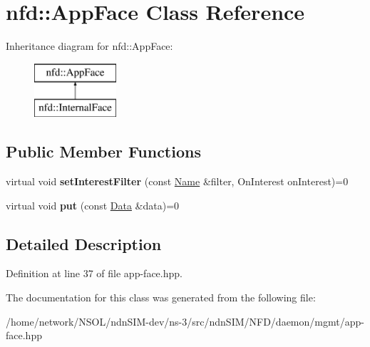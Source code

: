 \hypertarget{classnfd_1_1AppFace}{}\section{nfd\+:\+:App\+Face Class Reference}
\label{classnfd_1_1AppFace}
Inheritance diagram for nfd\+:\+:App\+Face\+:\begin{figure}[H]
\begin{center}
\leavevmode
\includegraphics[height=2.000000cm]{classnfd_1_1AppFace}
\end{center}
\end{figure}
\subsection*{Public Member Functions}
\begin{DoxyCompactItemize}
\item 
virtual void {\bfseries set\+Interest\+Filter} (const \hyperlink{classndn_1_1Name}{Name} \&filter, On\+Interest on\+Interest)=0\hypertarget{classnfd_1_1AppFace_a802bffeab9e689492937f77d9bfaa3c7}{}\label{classnfd_1_1AppFace_a802bffeab9e689492937f77d9bfaa3c7}

\item 
virtual void {\bfseries put} (const \hyperlink{classndn_1_1Data}{Data} \&data)=0\hypertarget{classnfd_1_1AppFace_ab0c196e816296ba8183b616b510b4ab1}{}\label{classnfd_1_1AppFace_ab0c196e816296ba8183b616b510b4ab1}

\end{DoxyCompactItemize}


\subsection{Detailed Description}


Definition at line 37 of file app-\/face.\+hpp.



The documentation for this class was generated from the following file\+:\begin{DoxyCompactItemize}
\item 
/home/network/\+N\+S\+O\+L/ndn\+S\+I\+M-\/dev/ns-\/3/src/ndn\+S\+I\+M/\+N\+F\+D/daemon/mgmt/app-\/face.\+hpp\end{DoxyCompactItemize}
